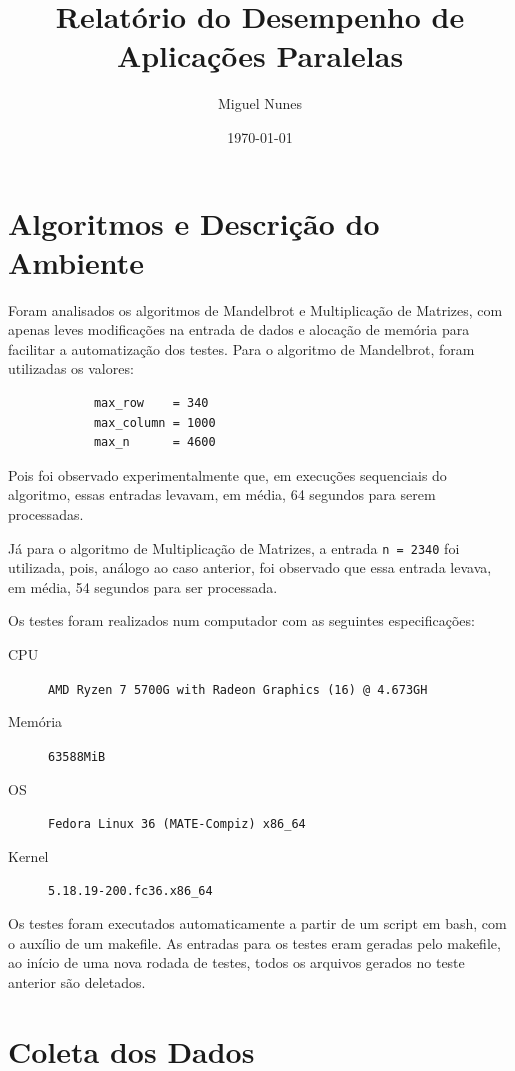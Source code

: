 \documentclass[10pt,a4paper]{article}
\title{Relatório do Desempenho de Aplicações Paralelas}
\author{Miguel Nunes}
\date{\today}
\begin{document}
	\maketitle

	\section{Algoritmos e Descrição do Ambiente}

		Foram analisados os algoritmos de Mandelbrot e Multiplicação de Matrizes, com apenas leves modificações na entrada de dados e
		alocação de memória para facilitar a automatização dos testes.
		Para o algoritmo de Mandelbrot, foram utilizadas os valores: 
		
		\begin{verbatim}
			max_row    = 340
			max_column = 1000
			max_n      = 4600
		\end{verbatim}

		Pois foi observado experimentalmente que, em execuções sequenciais do algoritmo, essas entradas levavam, em média, 
		64 segundos para serem processadas.

		Já para o algoritmo de Multiplicação de Matrizes, a entrada \texttt{n = 2340} foi utilizada, pois, 
		análogo ao caso anterior, foi observado que essa entrada levava, em média, 54 segundos para ser processada.

		Os testes foram realizados num computador com as seguintes especificações:

		\begin{description}
			\item[CPU] \texttt{AMD Ryzen 7 5700G with Radeon Graphics (16) @ 4.673GH}
			\item[Memória] \texttt{63588MiB}
			\item[OS] \texttt{Fedora Linux 36 (MATE-Compiz) x86\_64}
			\item[Kernel] \texttt{5.18.19-200.fc36.x86\_64}
		\end{description}

		Os testes foram executados automaticamente a partir de um script em bash, com o auxílio de um makefile. As entradas para os 
		testes eram geradas pelo makefile, ao início de uma nova rodada de testes, todos os arquivos gerados no teste anterior são deletados.

	\section{Coleta dos Dados}
		
\end{document}
